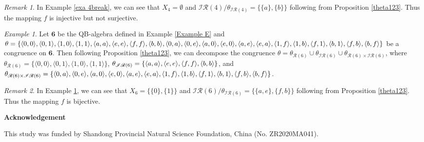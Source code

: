 \documentclass[12pt]{amsart}
\theoremstyle{definition}
\theoremstyle{remark}
\newtheorem{remark}{Remark}[section]
\newtheorem{example}{Example}[section]
\numberwithin{equation}{section}
\begin{document}
\begin{remark}
In Example \ref{exa 4break}, we can see that $X_{4}=\emptyset$ and $\mathscr{IR}(4)/\theta_{\mathscr{IR}(4)}=\{\{a\},\{b\}\}$ following from Proposition \ref{theta123}. Thus the mapping $f$ is injective but not surjective.
\end{remark}

\begin{example}\label{E con}
Let $\mathbf{6}$ be the QB-algebra defined in Example \ref{Example E} and $\theta=\{\langle 0,0\rangle,\langle 0,1\rangle, \langle 1,0\rangle,\langle 1,1\rangle,\langle a,\\a\rangle,\langle e,e\rangle,\langle f,f\rangle,\langle b,b\rangle,\langle 0,a\rangle, \langle 0,e\rangle,\langle a,0\rangle,\langle e,0\rangle,\langle a,e\rangle,\langle e,a\rangle,\langle 1,f\rangle, \langle 1,b\rangle,\langle f,1\rangle,\langle b,1\rangle,\langle f,b\rangle,\langle b,f\rangle \}$ be a congruence on $\mathbf{6}$. Then following Proposition \ref{theta123}, we can decompose the congruence $\theta=\theta_{\mathscr{R}(6)}\cup\theta_{\mathscr{IR}(6)}\cup\theta_{\mathscr{R}(6)\times \mathscr{IR}(6)}$, where $\theta_{\mathscr{R}(6)}=\{\langle0,0\rangle,\langle0,1\rangle, \langle1,0\rangle,\langle1,1\rangle\}$, $\theta_{\mathscr{IR}(6)}=\{\langle a,a\rangle, \langle e,e\rangle,\\ \langle f,f\rangle,\langle b,b\rangle\}$, and
$\theta_{\mathscr{R}(6)\times \mathscr{IR}(6)}=\{\langle 0,a\rangle, \langle 0,e\rangle,\langle a,0\rangle, \langle e,0\rangle,\langle a,e\rangle,\langle e,a\rangle,\langle 1,f\rangle, \langle 1,b\rangle,\langle f,1\rangle,\langle b,1\rangle,\\ \langle f,b\rangle,\langle b,f\rangle\}$.
\end{example}

\begin{remark}
In Example \ref{E con}, we can see that $X_{6}=\{\{0\},\{1\}\}$ and $\mathscr{IR}(6)/\theta_{\mathscr{IR}(6)}=\{\{a,e\},\{f,b\}\}$ following from Proposition \ref{theta123}. Thus the mapping $f$ is bijective.
\end{remark}




\noindent\textbf{Acknowledgement}

This study was funded by Shandong Provincial Natural Science Foundation, China
(No. ZR2020MA041).
\end{document}
